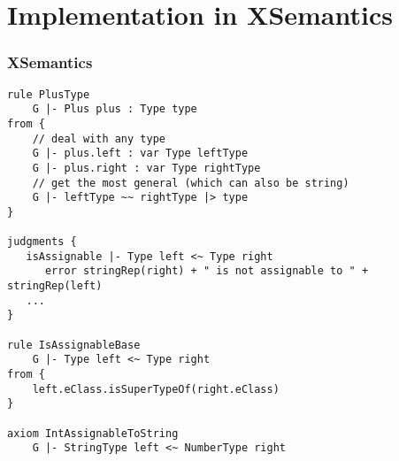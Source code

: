 \section[Xsemantics]{Implementation in XSemantics}

\begin{frame}
\frametitle{XSemantics}
\tableofcontents[currentsection]

\end{frame}

\begin{frame}

\begin{verbatim}
rule PlusType
	G |- Plus plus : Type type
from {
	// deal with any type
	G |- plus.left : var Type leftType
	G |- plus.right : var Type rightType
	// get the most general (which can also be string)
	G |- leftType ~~ rightType |> type
}

judgments {
   isAssignable |- Type left <~ Type right
	  error stringRep(right) + " is not assignable to " + stringRep(left)
   ...
}

rule IsAssignableBase
	G |- Type left <~ Type right
from {
	left.eClass.isSuperTypeOf(right.eClass)
}

axiom IntAssignableToString
	G |- StringType left <~ NumberType right

\end{verbatim}

\end{frame}